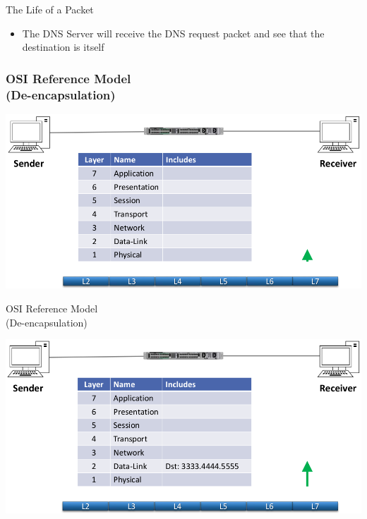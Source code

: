 \documentclass[pdflatex,compress,mathserif]{beamer}
\begin{document}
\begin{frame}{The Life of a Packet}
	\begin{itemize}
		\item The DNS Server will receive the DNS request packet and see that the
		destination is itself
	\end{itemize}
\end{frame}

\begin{frame}
	\frametitle{OSI Reference Model\\(De-encapsulation)}
	\begin{center}
		\includegraphics[width=\linewidth]{img/img29}
	\end{center}
\end{frame}

\begin{frame}{OSI Reference Model\\(De-encapsulation)}
	\begin{center}
		\includegraphics[width=\linewidth]{img/img30}
	\end{center}
\end{frame}
\end{document}
